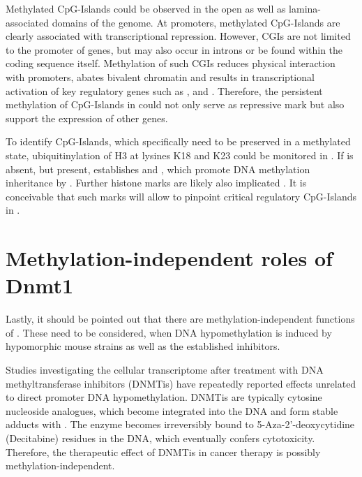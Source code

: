 Methylated CpG-Islands could be observed in the open as well as lamina-associated domains of the \mllafnine genome.  At promoters, methylated CpG-Islands are clearly associated with transcriptional repression. However, CGIs are not limited to the promoter of genes, but may also occur in introns or be found within the coding sequence itself.  Methylation of such CGIs reduces physical interaction with promoters, abates bivalent chromatin and results in transcriptional activation of key regulatory genes such as ,  and \cite{Lee2017}. Therefore, the persistent methylation of CpG-Islands in \dnmtchip could not only serve as repressive mark but also support the expression of other genes. 

To identify CpG-Islands, which specifically need to be preserved in a methylated state, ubiquitinylation of H3 at lysines K18 and K23 could be monitored in \dnmtchip. If \histwoarg is absent, but \hisninethree present,  establishes \hiseighteenub and \histwentythreeub, which promote DNA methylation inheritance by \cite{Harrison2016,DaRosa2018, Li2018a}. Further histone marks are likely also implicated . It is conceivable that such marks will allow to pinpoint critical regulatory CpG-Islands in \dnmtchip.   

\section{Methylation-independent roles of Dnmt1}
\label{chap:d:strain:dnmtonealtfunct}

Lastly, it should be pointed out that there are methylation-independent functions of . These need to be considered, when DNA hypomethylation is induced by hypomorphic  mouse strains as well as the established  inhibitors. 

Studies investigating the cellular transcriptome after treatment with DNA methyltransferase inhibitors (DNMTis) have repeatedly reported effects unrelated to direct promoter DNA hypomethylation\cite{Schmelz2005,Flotho2009}. DNMTis are typically cytosine nucleoside analogues, which become integrated into the DNA and form stable adducts with \cite{Christman2002}. The enzyme becomes irreversibly bound to 5-Aza-2'-deoxycytidine (Decitabine) residues in the DNA, which eventually confers cytotoxicity. Therefore, the therapeutic effect of DNMTis in cancer therapy is possibly methylation-independent\cite{Juettermann1994}.

